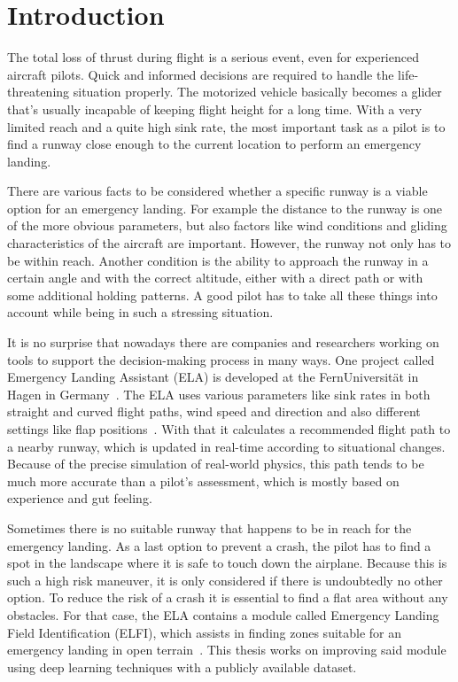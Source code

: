 \section{Introduction}
The total loss of thrust during flight is a serious event, even for experienced aircraft pilots. Quick and informed decisions are required to handle the life-threatening situation properly. The motorized vehicle basically becomes a glider that's usually incapable of keeping flight height for a long time. With a very limited reach and a quite high sink rate, the most important task as a pilot is to find a runway close enough to the current location to perform an emergency landing.

There are various facts to be considered whether a specific runway is a viable option for an emergency landing. For example the distance to the runway is one of the more obvious parameters, but also factors like wind conditions and gliding characteristics of the aircraft are important. However, the runway not only has to be within reach. Another condition is the ability to approach the runway in a certain angle and with the correct altitude, either with a direct path or with some additional holding patterns. A good pilot has to take all these things into account while being in such a stressing situation.

It is no surprise that nowadays there are companies and researchers working on tools to support the decision-making process in many ways. One project called Emergency Landing Assistant (ELA) is developed at the FernUniversität in Hagen in Germany~\cite{feu_fas}. The ELA uses various parameters like sink rates in both straight and curved flight paths, wind speed and direction and also different settings like flap positions~\cite{glide_path20}. With that it calculates a recommended flight path to a nearby runway, which is updated in real-time according to situational changes. Because of the precise simulation of real-world physics, this path tends to be much more accurate than a pilot's assessment, which is mostly based on experience and gut feeling.

Sometimes there is no suitable runway that happens to be in reach for the emergency landing. As a last option to prevent a crash, the pilot has to find a spot in the landscape where it is safe to touch down the airplane. Because this is such a high risk maneuver, it is only considered if there is undoubtedly no other option. To reduce the risk of a crash it is essential to find a flat area without any obstacles. For that case, the ELA contains a module called Emergency Landing Field Identification (ELFI), which assists in finding zones suitable for an emergency landing in open terrain~\cite{feu_elfi}. This thesis works on improving said module using deep learning techniques with a publicly available dataset.

